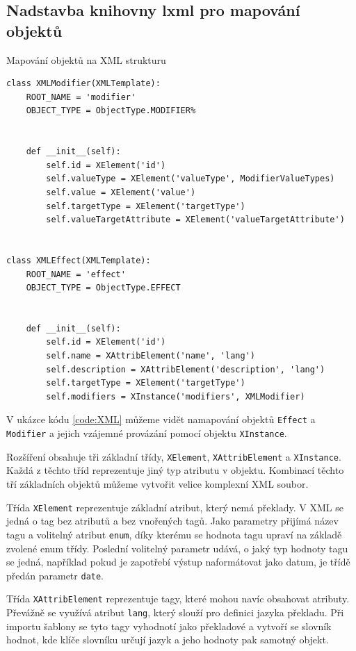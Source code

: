 \documentclass[thesis=B,czech]{resources/FITthesis}[2012/06/26]
\begin{document}
	\subsection{Nadstavba knihovny lxml pro mapování objektů}
	\begin{listing}[htbp]
\caption{\label{code:XML}Mapování objektů na XML strukturu}
\begin{verbatim}
class XMLModifier(XMLTemplate):
    ROOT_NAME = 'modifier'
    OBJECT_TYPE = ObjectType.MODIFIER%


    def __init__(self):
        self.id = XElement('id')
        self.valueType = XElement('valueType', ModifierValueTypes)
        self.value = XElement('value')
        self.targetType = XElement('targetType')
        self.valueTargetAttribute = XElement('valueTargetAttribute')


class XMLEffect(XMLTemplate):
    ROOT_NAME = 'effect'
    OBJECT_TYPE = ObjectType.EFFECT


    def __init__(self):
        self.id = XElement('id')
        self.name = XAttribElement('name', 'lang')
        self.description = XAttribElement('description', 'lang')
        self.targetType = XElement('targetType')
        self.modifiers = XInstance('modifiers', XMLModifier)
\end{verbatim}
\end{listing}
	 V ukázce kódu  \ref{code:XML} můžeme vidět namapování objektů \texttt{Effect} a \texttt{Modifier} a jejich vzájemné provázání pomocí objektu \texttt{XInstance}. \par

Rozšíření obsahuje tři základní třídy, \texttt{XElement}, \texttt{XAttribElement} a \texttt{XInstance}. Každá z těchto tříd reprezentuje jiný typ atributu v objektu. Kombinací těchto tří základních objektů můžeme vytvořit velice komplexní XML soubor. \par

Třída \texttt{XElement} reprezentuje základní atribut, který nemá překlady. V XML se jedná o tag bez atributů a bez vnořených tagů. Jako parametry přijímá název tagu a volitelný atribut \texttt{enum}, díky kterému se hodnota tagu upraví na základě zvolené enum třídy. Poslední volitelný parametr udává, o jaký typ hodnoty tagu se jedná, například pokud je zapotřebí výstup naformátovat jako datum, je třídě předán parametr \texttt{date}. \par

Třída \texttt{XAttribElement} reprezentuje tagy, které mohou navíc obsahovat atributy. Převážně se využívá atribut \texttt{lang}, který slouží pro definici jazyka překladu. Při importu šablony se tyto tagy vyhodnotí jako překladové a vytvoří se slovník hodnot, kde klíče slovníku určují jazyk a jeho hodnoty pak samotný objekt. \par
\end{document}
